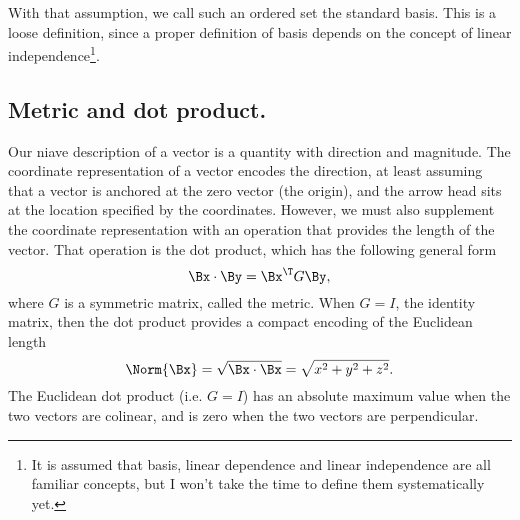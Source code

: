 With that assumption, we call such an ordered set the standard basis.
This is a loose definition, since a proper definition of basis depends on the concept of linear independence\footnote{It is assumed that basis, linear dependence and linear independence are all familiar concepts, but I won't take the time to define them systematically yet.}.
%
%
%

\subsection{Metric and dot product.}
Our niave description of a vector is a quantity with direction and magnitude.
The
coordinate representation of a vector encodes the direction, at least assuming that a vector is anchored at the zero vector (the origin), and the arrow head sits at the location specified by the coordinates.
However, we must also supplement the coordinate representation with an operation that provides the length of the vector.
That operation is the dot product, which has the following general form
\begin{equation}\label{eqn:multivector:101}
\Bx \cdot \By = \Bx^\T G \By,
\end{equation}
where \( G \) is a symmetric matrix, called the metric.
When \( G = I \), the identity matrix, then the dot product provides a compact encoding of the Euclidean length
\begin{equation}\label{eqn:multivector:80}
\Norm{\Bx} = \sqrt{ \Bx \cdot \Bx } = \sqrt{x^2 + y^2 + z^2}.
\end{equation}
The Euclidean dot product (i.e. \( G = I \)) has an absolute maximum value when the two vectors are colinear, and is zero when the two vectors are perpendicular.

